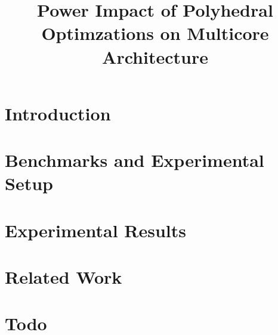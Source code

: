 \documentclass[10pt,conference,letterpaper]{IEEEtran}
\title{Power Impact of Polyhedral Optimzations on Multicore Architecture}
\begin{document}
\maketitle

%

\section{Introduction}
\label{sec:intro}


\section{Benchmarks and Experimental Setup}
\label{sec:benchmarks}

\label{sec:setup}


\section{Experimental Results}
\label{sec:results}


\section{Related Work}
\label{sec:related}


\section {Todo}
\label{sec:conclusion}






\end{document}
